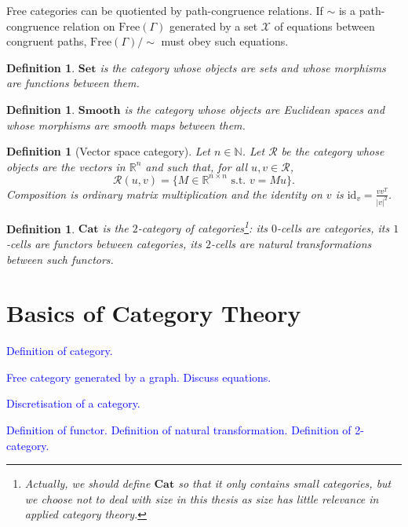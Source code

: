 \documentclass[11pt,a4paper,openright,twoside]{report}
\theoremstyle{plain}
\newtheorem{definition}[proposition]{Definition}
\theoremstyle{definition}
\begin{document}
Free categories can be quotiented by path-congruence relations. If ${\sim}$ is a path-congruence relation on $\mathrm{Free}(\Gamma)$ generated by a set $\mathcal{X}$ of equations between congruent paths, $\mathrm{Free}(\Gamma)/{\sim}$ must obey such equations.

\begin{definition}
  \label{def: set}
  $\mathbf{Set}$ is the category whose objects are sets and whose morphisms are functions between them.
\end{definition}

\begin{definition}
  \label{def: smooth}
  $\mathbf{Smooth}$ is the category whose objects are Euclidean spaces and whose morphisms are smooth maps between them.
\end{definition}

\begin{definition}[Vector space category]
  \label{def: vecspacecat}
  Let $n \in \mathbb{N}$. Let $\mathcal{R}$ be the category whose objects are the vectors in $\mathbb{R}^n$ and such that, for all $u,v \in \mathcal{R}$, 
  \[\mathcal{R}(u, v) = \{M \in \mathbb{R}^{n \times n} \text{ s.t. } v = Mu\}.\]
  Composition is ordinary matrix multiplication and the identity on $v$ is $\mathrm{id}_v = \frac{vv^T}{|v|^2}$.
\end{definition}

\begin{definition}
  $\mathbf{Cat}$ is the $2$-category of categories\footnote{Actually, we should define $\mathbf{Cat}$ so that it only contains small categories, but we choose not to deal with size in this thesis as size has little relevance in applied category theory.}: its $0$-cells are categories, its $1$-cells are functors between categories, its $2$-cells are natural transformations between such functors.
\end{definition}

\section{Basics of Category Theory}


\textcolor{blue}{Definition of category.}

\textcolor{blue}{Free category generated by a graph. Discuss equations.}

\textcolor{blue}{Discretisation of a category.}

\textcolor{blue}{Definition of functor.}
\textcolor{blue}{Definition of natural transformation.}
\textcolor{blue}{Definition of 2-category.}
\end{document}
